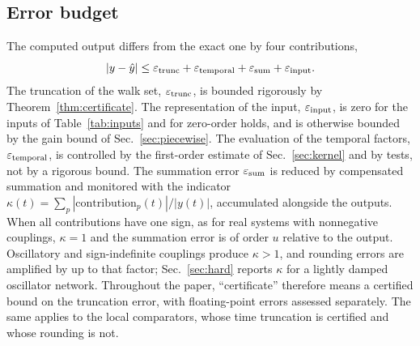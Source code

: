 \subsection{Error budget}\label{sec:budget}
The computed output differs from the exact one by four contributions,
\begin{equation}\label{eq:budget}
|y-\hat y|\le\varepsilon_{\rm trunc}+\varepsilon_{\rm temporal}+\varepsilon_{\rm sum}+\varepsilon_{\rm input}.
\end{equation}
The truncation of the walk set, $\varepsilon_{\rm trunc}$, is bounded rigorously by Theorem~\ref{thm:certificate}. The representation of the input, $\varepsilon_{\rm input}$, is zero for the inputs of Table~\ref{tab:inputs} and for zero-order holds, and is otherwise bounded by the gain bound of Sec.~\ref{sec:piecewise}. The evaluation of the temporal factors, $\varepsilon_{\rm temporal}$, is controlled by the first-order estimate of Sec.~\ref{sec:kernel} and by tests, not by a rigorous bound. The summation error $\varepsilon_{\rm sum}$ is reduced by compensated summation and monitored with the indicator $\kappa(t)=\sum_p|\text{contribution}_p(t)|/|y(t)|$, accumulated alongside the outputs. When all contributions have one sign, as for real systems with nonnegative couplings, $\kappa=1$ and the summation error is of order $u$ relative to the output. Oscillatory and sign-indefinite couplings produce $\kappa>1$, and rounding errors are amplified by up to that factor; Sec.~\ref{sec:hard} reports $\kappa$ for a lightly damped oscillator network. Throughout the paper, ``certificate'' therefore means a certified bound on the truncation error, with floating-point errors assessed separately. The same applies to the local comparators, whose time truncation is certified and whose rounding is not.
